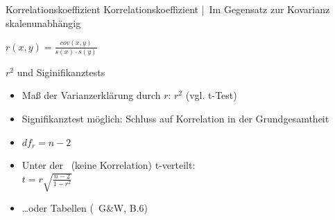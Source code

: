 \begin{frame}
  {Korrelationskoeffizient}
  \alert{Korrelationskoeffizient} | Im Gegensatz zur Kovarianz \alert{skalenunabhängig}\\
  \vspace{3\baselineskip}
  \begin{center}
    $r(x,y)=\frac{cov(x,y)}{s(x)\cdot s(y)}$\\
    \Zeile
  \end{center}
\end{frame}





\begin{frame}
  {$r^2$ und Siginifikanztests}
  \begin{itemize}[<+->]
    \item Maß der Varianzerklärung durch $r$: \alert{$r^2$} (vgl. t-Test)
    \item \alert{Signifikanztest} möglich: Schluss auf Korrelation in der Grundgesamtheit
    \item $df_r=n-2$
    \item Unter der \Null\ (keine Korrelation) t-verteilt:\\
      \alert{$t=r\sqrt{\frac{n-2}{1-r^2}}$}
    \item \dots oder Tabellen (\zB\ G\&W, B.6)
  \end{itemize}
\end{frame}

